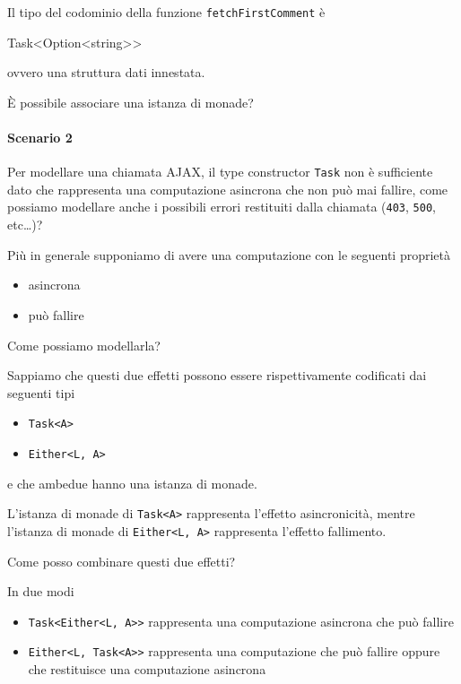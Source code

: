 \documentclass[12pt]{article}
\theoremstyle{definition}
\newenvironment{code}
  {\vspace{0.5cm} \VerbatimEnvironment\begin{typescriptcode}}
  {\end{typescriptcode} \vspace{0.2cm}}
\begin{document}
Il tipo del codominio della funzione \texttt{fetchFirstComment} è

\begin{code}
Task<Option<string>>
\end{code}

ovvero una struttura dati innestata.

È possibile associare una istanza di monade?

\paragraph{Scenario 2}

Per modellare una chiamata AJAX, il type constructor \texttt{Task} non è sufficiente dato che rappresenta una computazione
asincrona che non può mai fallire, come possiamo modellare anche i possibili errori restituiti dalla chiamata (\texttt{403}, \texttt{500}, etc\ldots)?

Più in  generale supponiamo di avere una computazione con le seguenti proprietà

\begin{itemize}
\item asincrona
\item può fallire
\end{itemize}

Come possiamo modellarla?

Sappiamo che questi due effetti possono essere rispettivamente codificati dai seguenti tipi

\begin{itemize}
\item \texttt{Task<A>}
\item \texttt{Either<L, A>}
\end{itemize}

e che ambedue hanno una istanza di monade.

L'istanza di monade di \texttt{Task<A>} rappresenta l'effetto asincronicità, mentre l'istanza
di monade di \texttt{Either<L, A>} rappresenta l'effetto fallimento.

Come posso combinare questi due effetti?

In due modi

\begin{itemize}
\item \texttt{Task<Either<L, A>>} rappresenta una computazione asincrona che può fallire
\item \texttt{Either<L, Task<A>>} rappresenta una computazione che può fallire oppure che restituisce una computazione asincrona
\end{itemize}
\end{document}
